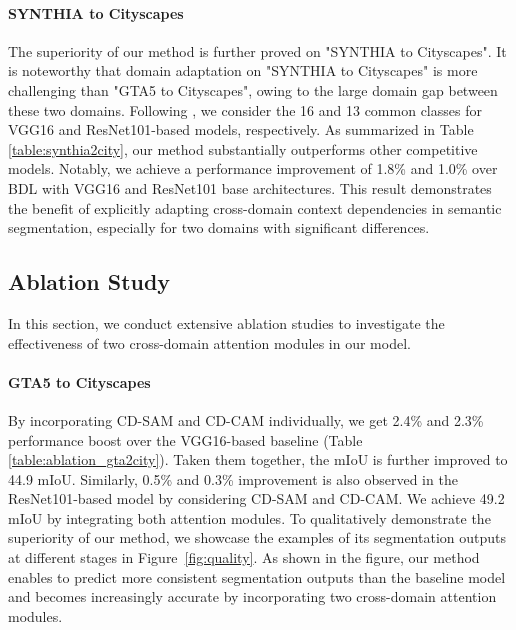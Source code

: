 \documentclass[10pt,twocolumn,letterpaper]{article}
\begin{document}
	\paragraph{SYNTHIA to Cityscapes}

	The superiority of our method is further proved on "SYNTHIA to Cityscapes". It is noteworthy that domain adaptation on "SYNTHIA to Cityscapes" is more challenging than "GTA5 to Cityscapes", owing to the large domain gap between these two domains. Following \cite{li2019bidirectional}, we consider the 16 and 13 common classes for VGG16 and ResNet101-based models, respectively. As summarized in Table \ref{table:synthia2city}, our method substantially outperforms other competitive models. Notably, we achieve a performance improvement of 1.8\% and 1.0\% over BDL \cite{li2019bidirectional} with VGG16 and ResNet101 base architectures. This result demonstrates the benefit of explicitly adapting cross-domain context dependencies in semantic segmentation, especially for two domains with significant differences.





	\subsection{Ablation Study}

	In this section, we conduct extensive ablation studies to investigate the effectiveness of two cross-domain attention modules in our model.

	\paragraph{GTA5 to Cityscapes}

	By incorporating CD-SAM and CD-CAM individually, we get 2.4\% and 2.3\% performance boost over the VGG16-based baseline (Table \ref{table:ablation_gta2city}). Taken them together, the mIoU is further improved to 44.9 mIoU. Similarly, 0.5\% and 0.3\% improvement is also observed in the ResNet101-based model by considering CD-SAM and CD-CAM. We achieve 49.2 mIoU by integrating both attention modules. To qualitatively demonstrate the superiority of our method, we showcase the examples of its segmentation outputs at different stages in Figure~\ref{fig:quality}. As shown in the figure, our method enables to predict more consistent segmentation outputs than the baseline model and becomes increasingly accurate by incorporating two cross-domain attention modules.
\end{document}
